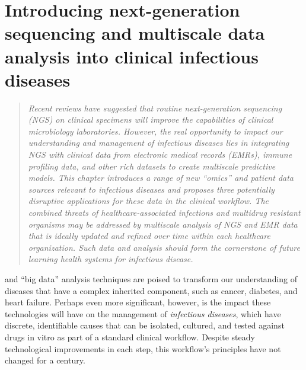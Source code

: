
\chapter{Introducing next-generation sequencing and multiscale data analysis into clinical infectious diseases}
\label{chap:intro}



\begin{quote}
\emph{Recent reviews have suggested that routine next-generation sequencing (NGS) on clinical specimens will improve the capabilities of clinical microbiology laboratories. However, the real opportunity to impact our understanding and management of infectious diseases lies in integrating NGS with clinical data from electronic medical records (EMRs), immune profiling data, and other rich datasets to create multiscale predictive models. This chapter introduces a range of new “omics” and patient data sources relevant to infectious diseases and proposes three potentially disruptive applications for these data in the clinical workflow. The combined threats of healthcare-associated infections and multidrug resistant organisms may be addressed by multiscale analysis of NGS and EMR data that is ideally updated and refined over time within each healthcare organization. Such data and analysis should form the cornerstone of future learning health systems for infectious disease.}
\end{quote}

 and “big data” analysis techniques are poised to transform our understanding of diseases that have a complex inherited component, such as cancer, diabetes, and heart failure. Perhaps even more significant, however, is the impact these technologies will have on the management of \emph{infectious diseases}, which have discrete, identifiable causes that can be isolated, cultured, and tested against drugs in vitro as part of a standard clinical workflow. Despite steady technological improvements in each step, this workflow’s principles have not changed for a century.\autocite{Didelot2012,Koser2012}

